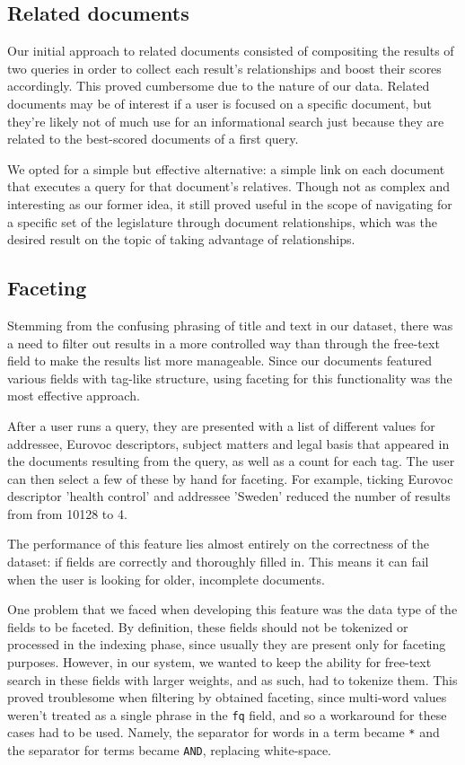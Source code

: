 \documentclass[sigconf, authorversion]{acmart}
\begin{document}
\subsection{Related documents}
Our initial approach to related documents consisted of compositing the results of two queries in order to collect each result's relationships and boost their scores accordingly. This proved cumbersome due to the nature of our data. Related documents may be of interest if a user is focused on a specific document, but they're likely not of much use for an informational search just because they are related to the best-scored documents of a first query.

We opted for a simple but effective alternative: a simple link on each document that executes a query for that document's relatives. Though not as complex and interesting as our former idea, it still proved useful in the scope of navigating for a specific set of the legislature through document relationships, which was the desired result on the topic of taking advantage of relationships.

\subsection{Faceting}
\label{sec:faceting}
Stemming from the confusing phrasing of title and text in our dataset, there was a need to filter out results in a more controlled way than through the free-text field to make the results list more manageable. Since our documents featured various fields with tag-like structure, using faceting for this functionality was the most effective approach.

After a user runs a query, they are presented with a list of different values for addressee, Eurovoc descriptors, subject matters and legal basis that appeared in the documents resulting from the query, as well as a count for each tag. The user can then select a few of these by hand for faceting. For example, ticking Eurovoc descriptor 'health control' and addressee 'Sweden' reduced the number of results from from 10128 to 4.

The performance of this feature lies almost entirely on the correctness of the dataset: if fields are correctly and thoroughly filled in. This means it can fail when the user is looking for older, incomplete documents.

One problem that we faced when developing this feature was the data type of the fields to be faceted. By definition, these fields should not be tokenized or processed in the indexing phase, since usually they are present only for faceting purposes. However, in our system, we wanted to keep the ability for free-text search in these fields with larger weights, and as such, had to tokenize them. This proved troublesome when filtering by obtained faceting, since multi-word values weren't treated as a single phrase in the \texttt{fq} field, and so a workaround for these cases had to be used. Namely, the separator for words in a term became \texttt{*} and the separator for terms became \texttt{AND}, replacing white-space.
\end{document}
